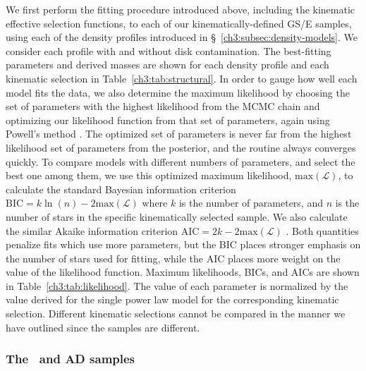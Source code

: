 We first perform the fitting procedure introduced above, including the kinematic effective selection functions, to each of our kinematically-defined GS/E samples, using each of the density profiles introduced in \S~\ref{ch3:subsec:density-models}. We consider each profile with and without disk contamination. The best-fitting parameters and derived masses are shown for each density profile and each kinematic selection in Table~\ref{ch3:tab:structural}. In order to gauge how well each model fits the data, we also determine the maximum likelihood by choosing the set of parameters with the highest likelihood from the MCMC chain and optimizing our likelihood function from that set of parameters, again using Powell's method \parencite{powell64}. The optimized set of parameters is never far from the highest likelihood set of parameters from the posterior, and the routine always converges quickly. To compare models with different numbers of parameters, and select the best one among them, we use this optimized maximum likelihood, $\mathrm{max}(\mathcal{L})$, to calculate the standard Bayesian information criterion $\mathrm{BIC} = k\ln(n) - 2\mathrm{max}(\mathcal{L})$ \parencite{schwarz78} where $k$ is the number of parameters, and $n$ is the number of stars in the specific kinematically selected sample. We also calculate the similar Akaike information criterion $\mathrm{AIC} = 2k - 2\mathrm{max}(\mathcal{L})$ \parencite{akaike74}. Both quantities penalize fits which use more parameters, but the BIC places stronger emphasis on the number of stars used for fitting, while the AIC places more weight on the value of the likelihood function. Maximum likelihoods, BICs, and AICs are shown in Table~\ref{ch3:tab:likelihood}. The value of each parameter is normalized by the value derived for the single power law model for the corresponding kinematic selection. Different kinematic selections cannot be compared in the manner we have outlined since the samples are different.



\subsubsection{The \eLz\ and AD samples}
\label{ch3:subsubsec:eLz-and-AD-samples}

